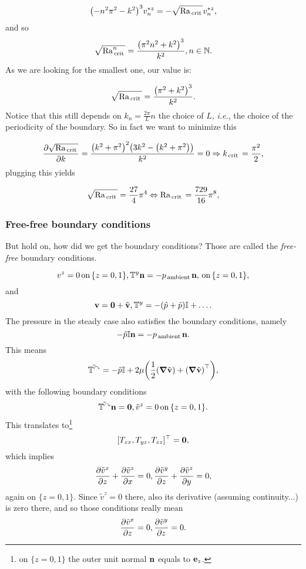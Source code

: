 \documentclass[reqno, a4paper]{article}
\begin{document}
\[
	\qty(-n^{2} \pi^{2} - k^{2})^{3}v^{*z}_n = -\sqrt{\mathrm{Ra}_{\, \text{crit} \,}}v^{*z}_n,
\]
and so 
\[
	\sqrt{\mathrm{Ra}^n_{\, \text{crit} \,}} = \frac{\qty(\pi^{2}n^{2}+k^{2})^{3}}{k^{2}}, n \in {\mathbb N}.
\]
As we are looking for the smallest one, our value is:

\[
	\sqrt{\mathrm{Ra}_{\, \text{crit} \,}} = \frac{\qty(\pi^{2}+k^{2})^{3}}{k^{2}}.
\]
Notice that this still depends on $k_n = \frac{2 \pi}{L}n$ the choice of $L$, \textit{i.e.}, the choice of the periodicity of the boundary. So in fact we want to minimize this

\[
	\pdv{\sqrt{\mathrm{Ra}_{\, \text{crit} \,}}}{k} = \frac{\qty(k^{2}+\pi^{2})^{2}\qty(3k^{2}-\qty(k^{2}+\pi^{2}))}{k^{2}} = 0 \Rightarrow k_{\, \text{crit} \,} = \frac{\pi^{2}}{2},
\]
plugging this yields

\begin{equation}
    \label{eq:Rayileigh_crit}
    \sqrt{\mathrm{Ra}_{\, \text{crit} \,}} = \frac{27}{4}\pi^4 \Leftrightarrow \mathrm{Ra}_{\, \text{crit} \,} = \frac{729}{16}\pi^8,
\end{equation}

\subsubsection{Free-free boundary conditions}
\label{sec:free_free}

But hold on, how did we get the boundary conditions? Those are called the \textit{free-free} boundary conditions.

\[
	v^z = 0 \, \text{on} \,\{z = 0,1 \},\mathbb{T}^y \vb{n} = - p_{\, \text{ambient} \,} \vb{n},\, \text{on} \, \{z = 0,1\},
\]
and
\[
	\vb{v} = \vb{0} + \tilde{\vb{v}}, \mathbb{T}^y = -\qty(\hat{p}+\tilde{p})\mathbb{I} + \dots.
\]
The pressure in the steady case also satisfies the boundary conditions, namely
\[
	-\hat{p}\mathbb{I} \vb{n} = - p_{\, \text{ambient} \,}\vb{n}.
\]
This means
\[
	\tilde{\mathbb{T}^y}= - \tilde{p}\mathbb{I} + 2 \mu\qty(\frac{1}{2}\qty(\grad \tilde{\vb{v}})+\qty(\grad \tilde{\vb{v}})^\top),
\]
with the following boundary conditions
\[
	\tilde{\mathbb{T}^y}\vb{n} = \vb{0} , \tilde{v}^z = 0 \, \text{on} \, \{z = 0,1\}.
\]
This translates to\footnote{on $\{z = 0,1\}$ the outer unit normal $\vb{n}$ equals to $\vb{e}_z$.}
\[
	[T_{zx}, T_{yz}, T_{zz}]^\top = \vb{0},
\]
which implies
\[
	\pdv{\tilde{v}^x}{z} + \pdv{\tilde{v}^z}{x} = 0, \pdv{\tilde{v}^y}{z}+ \pdv{\tilde{v}^z}{y} = 0,
\]
again on $\{z = 0,1\}.$ Since $\tilde{v}^z = 0$ there, also its derivative (assuming continuity...) is zero there, and so those conditions really mean
\[
	\pdv{\tilde{v}^x}{z} = 0, \pdv{\tilde{v}^y}{z} = 0.
\]
\end{document}
